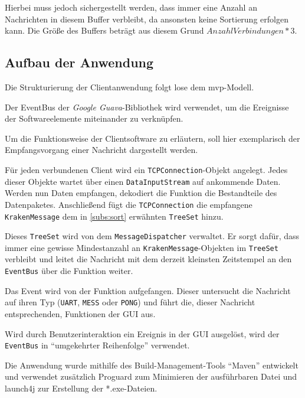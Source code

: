 Hierbei muss jedoch sichergestellt werden, dass immer eine Anzahl an Nachrichten
in diesem Buffer verbleibt, da ansonsten keine Sortierung erfolgen kann. Die
Größe des Buffers beträgt aus diesem Grund $\mathit{AnzahlVerbindungen}*3$.

\subsection{Aufbau der Anwendung}
Die Strukturierung der Clientanwendung folgt lose dem \gls{mvp}-Modell.

Der EventBus der \emph{Google Guava}-Bibliothek\cite{GOOG} wird verwendet, um
die Ereignisse der Softwareelemente miteinander zu verknüpfen. 

Um die Funktionsweise der Clientsoftware zu erläutern, soll hier exemplarisch
der Empfangsvorgang einer Nachricht dargestellt werden.

Für jeden verbundenen Client wird ein \texttt{TCPConnection}-Objekt angelegt.
Jedes dieser Objekte wartet über einen \texttt{DataInputStream} auf ankommende
Daten. Werden nun Daten empfangen, dekodiert die Funktion
 die Bestandteile des Datenpaketes.
Anschließend fügt die \texttt{TCPConnection} die
empfangene \texttt{KrakenMessage} dem in \autoref{subs:sort} erwähnten
\texttt{TreeSet} hinzu.

Dieses \texttt{TreeSet} wird von dem \texttt{MessageDispatcher} verwaltet. Er
sorgt dafür, dass immer eine gewisse Mindestanzahl an
\texttt{KrakenMessage}-Objekten im \texttt{TreeSet} verbleibt und
leitet die Nachricht mit dem derzeit kleinsten Zeitstempel an den
\texttt{EventBus} über die Funktion  weiter.

Das Event wird von der Funktion 
aufgefangen. Dieser untersucht die Nachricht auf ihren
Typ (\texttt{UART}, \texttt{MESS} oder \texttt{PONG}) und führt die, dieser
Nachricht entsprechenden, Funktionen der GUI aus.

Wird durch Benutzerinteraktion ein Ereignis in der GUI ausgelöst, wird der
\texttt{EventBus} in "`umgekehrter Reihenfolge"' verwendet. 

Die Anwendung wurde mithilfe des Build-Management-Tools "`Maven"'\cite{MVN}
entwickelt und verwendet zusätzlich Proguard\cite{PROG} zum Minimieren der
ausführbaren Datei und launch4j\cite{L4J} zur Erstellung der *.exe-Dateien.

